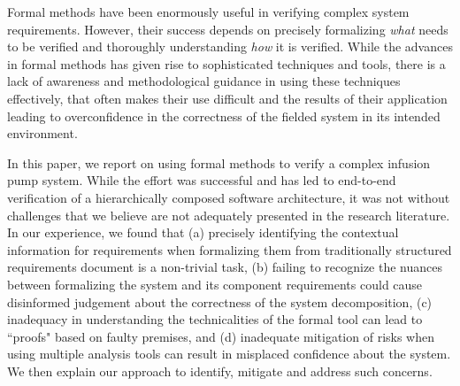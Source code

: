 Formal methods have been enormously useful in verifying complex system requirements. However, their success depends on precisely formalizing {\em what} needs to be verified and thoroughly understanding {\em how} it is verified. While the advances in formal methods has given rise to sophisticated techniques and tools, there is a lack of awareness and methodological guidance in using these techniques effectively, that often makes their use difficult and the results of their application leading to overconfidence in the correctness of the fielded system in its intended environment.

In this paper, we report on using formal methods to verify a complex infusion pump system.  While the effort was successful and has led to end-to-end verification of a hierarchically composed software architecture, it was not without challenges that we believe are not adequately presented in the research literature. In our experience, we found that (a) precisely identifying the contextual information for requirements when formalizing them from traditionally structured requirements document is a non-trivial task, (b) failing to recognize the nuances between formalizing the system and its component requirements could cause disinformed judgement about the correctness of the system decomposition, (c) inadequacy in understanding the technicalities of the formal tool can lead to ``proofs" based on faulty premises, and (d) inadequate mitigation of risks when using multiple analysis tools can result in misplaced confidence about the system. We then explain our approach to identify, mitigate and address such concerns.


